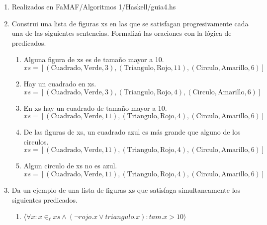 \documentclass[12pt]{article} %
\begin{document}
\begin{enumerate}
    \item Realizados en FaMAF/Algoritmos 1/Haskell/guia4.hs
    \item Construi una lista de figuras xs en las que se satisfagan progresivamente cada una de las siguientes
    sentencias. Formalizá las oraciones con la lógica de predicados.
    \begin{enumerate}
        \item Alguna figura de xs es de tamaño mayor a 10. \\
        \( xs = [(\text{Cuadrado}, \text{Verde}, 3),(\text{Triangulo}, \text{Rojo}, 11), (\text{Circulo}, \text{Amarillo}, 6)] \) 
        \item Hay un cuadrado en xs. \\
        \( xs = [(\text{Cuadrado}, \text{Verde}, 3),(\text{Triangulo}, \text{Rojo}, 4), (\text{Circulo}, \text{Amarillo}, 6)] \)
        \item En xs hay un cuadrado de tamaño mayor a 10. \\
        \( xs = [(\text{Cuadrado}, \text{Verde}, 11),(\text{Triangulo}, \text{Rojo}, 4), (\text{Circulo}, \text{Amarillo}, 6)] \)
        \item De las figuras de xs, un cuadrado azul es más grande que alguno de los circulos. \\
        \( xs = [(\text{Cuadrado}, \text{Verde}, 11),(\text{Triangulo}, \text{Rojo}, 4), (\text{Circulo}, \text{Amarillo}, 6)] \)
        \item Algun circulo de xs no es azul. \\
        \( xs = [(\text{Cuadrado}, \text{Verde}, 11),(\text{Triangulo}, \text{Rojo}, 4), (\text{Circulo}, \text{Amarillo}, 6)] \)
    \end{enumerate}
    \item Da un ejemplo de una lista de figuras xs que satisfaga simultaneamente los siguientes predicados.
    \begin{enumerate}
        \item \( \langle \forall x : x \in_\ell xs \land (\neg rojo.x \lor triangulo.x) : tam.x > 10 \rangle \)
    \end{enumerate}


\end{enumerate}
\end{document}
